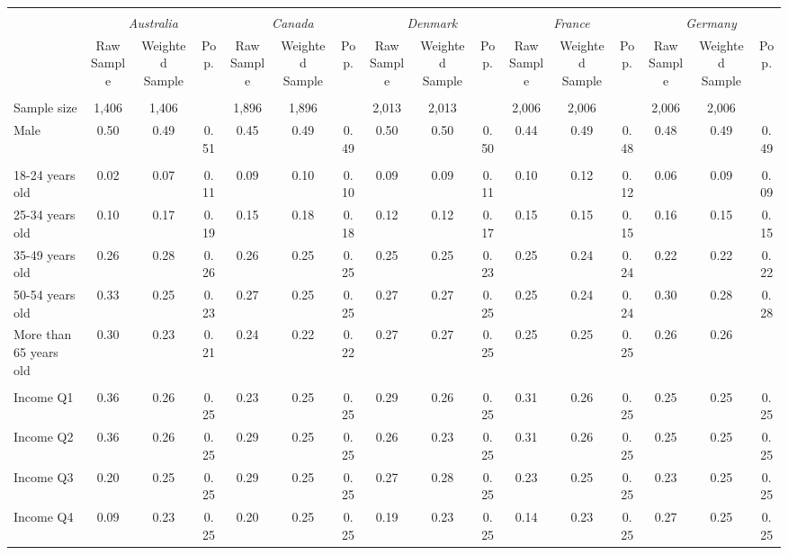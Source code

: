 \begin{tabular}{l*{15}{c}}
\toprule
\hline \\[-1.8ex]
\multicolumn{1}{c}{\em{ }} & \multicolumn{3}{c}{\em{Australia}} & \multicolumn{3}{c}{\em{Canada}} & \multicolumn{3}{c}{\em{Denmark}} & \multicolumn{3}{c}{\em{France}} & \multicolumn{3}{c}{\em{Germany}} \\
\cmidrule(l{3pt}r{3pt}){2-4} \cmidrule(l{3pt}r{3pt}){5-7} \cmidrule(l{3pt}r{3pt}){8-10} \cmidrule(l{3pt}r{3pt}){11-13} \cmidrule(l{3pt}r{3pt}){14-16}
\noalign{\smallskip}  & Raw Sample & Weighted Sample & Pop. & Raw Sample & Weighted Sample & Pop. & Raw Sample & Weighted Sample & Pop. & Raw Sample & Weighted Sample & Pop. & Raw Sample & Weighted Sample & Pop. \\
\hline \\[-1.8ex] 
Sample size & 1,406 & 1,406 & & 1,896 & 1,896 & & 2,013 & 2,013 & & 2,006 & 2,006 & & 2,006 & 2,006 & \\
\noalign{\smallskip}\hline \noalign{\smallskip}Male & 0.50 & 0.49 & 0.51 & 0.45 & 0.49 & 0.49 & 0.50 & 0.50 & 0.50 & 0.44 & 0.49 & 0.48 & 0.48 & 0.49 & 0.49 \\ 
\\
18-24 years old & 0.02 & 0.07 & 0.11 & 0.09 & 0.10 & 0.10 & 0.09 & 0.09 & 0.11 & 0.10 & 0.12 & 0.12 & 0.06 & 0.09 & 0.09 \\
25-34 years old & 0.10 & 0.17 & 0.19 & 0.15 & 0.18 & 0.18 & 0.12 & 0.12 & 0.17 & 0.15 & 0.15 & 0.15 & 0.16 & 0.15 & 0.15 \\
35-49 years old & 0.26 & 0.28 & 0.26 & 0.26 & 0.25 & 0.25 & 0.25 & 0.25 & 0.23 & 0.25 & 0.24 & 0.24 & 0.22 & 0.22 & 0.22 \\
50-54 years old & 0.33 & 0.25 & 0.23 & 0.27 & 0.25 & 0.25 & 0.27 & 0.27 & 0.25 & 0.25 & 0.24 & 0.24 & 0.30 & 0.28 & 0.28 \\
More than 65 years old & 0.30 & 0.23 & 0.21 & 0.24 & 0.22 & 0.22 & 0.27 & 0.27 & 0.25 & 0.25 & 0.25 & 0.25 & 0.26 & 0.26 \\ 
\\
Income Q1 & 0.36 & 0.26 & 0.25 & 0.23 & 0.25 & 0.25 & 0.29 & 0.26 & 0.25 & 0.31 & 0.26 & 0.25 & 0.25 & 0.25 & 0.25 \\
Income Q2 & 0.36 & 0.26 & 0.25 & 0.29 & 0.25 & 0.25 & 0.26 & 0.23 & 0.25 & 0.31 & 0.26 & 0.25 & 0.25 & 0.25 & 0.25 \\
Income Q3 & 0.20 & 0.25 & 0.25 & 0.29 & 0.25 & 0.25 & 0.27 & 0.28 & 0.25 & 0.23 & 0.25 & 0.25 & 0.23 & 0.25 & 0.25 \\
Income Q4 & 0.09 & 0.23 & 0.25 & 0.20 & 0.25 & 0.25 & 0.19 & 0.23 & 0.25 & 0.14 & 0.23 & 0.25 & 0.27 & 0.25 & 0.25 \\

\end{tabular}
